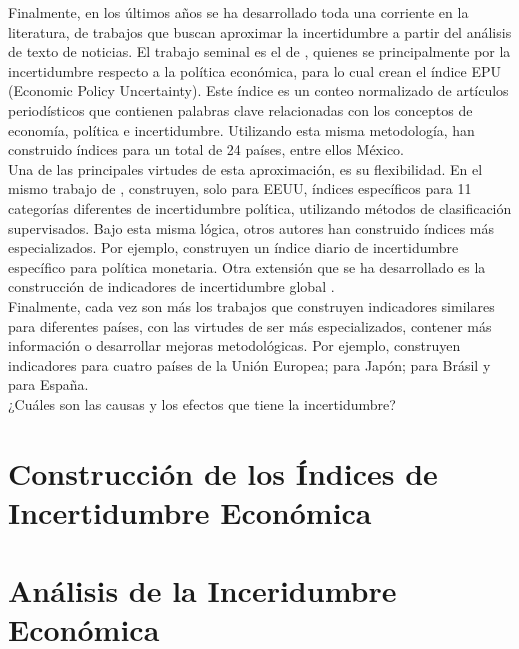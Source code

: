 \documentclass[11pt,a4paper]{article}
\begin{document}
Finalmente, en los últimos años se ha desarrollado toda una corriente en la literatura, de trabajos que buscan aproximar la incertidumbre a partir del análisis de texto de noticias. El trabajo seminal es el de \cite{baker_2016}, quienes se principalmente por la incertidumbre respecto a la política económica, para lo cual crean el índice EPU (Economic Policy Uncertainty). Este índice es un conteo normalizado de artículos periodísticos que contienen palabras clave relacionadas con los conceptos de economía, política e incertidumbre. Utilizando esta misma metodología, han construido índices para un total de 24 países, entre ellos México. \\

Una de las principales virtudes de esta aproximación, es su flexibilidad. En el mismo trabajo de \cite{baker_2016}, construyen, solo para EEUU, índices específicos para 11 categorías diferentes de incertidumbre política, utilizando métodos de clasificación supervisados. Bajo esta misma lógica, otros autores han construido índices más especializados. Por ejemplo, \cite{husted_2016} construyen un índice diario de incertidumbre específico para política monetaria. Otra extensión que se ha desarrollado es la construcción de indicadores de incertidumbre global \citep{davis_2016, caldara_2016, ahir_2018}. \\

Finalmente, cada vez son más los trabajos que construyen indicadores similares para diferentes países, con las virtudes de ser más especializados, contener más información o desarrollar mejoras metodológicas. Por ejemplo, \cite{azqueta_2020} construyen indicadores para cuatro países de la Unión Europea; \cite{arbatli_2017} para Japón; \cite{ferreira_2019} para Brásil y \cite{ghirelli_2019} para España. \\


¿Cuáles son las causas y los efectos que tiene la incertidumbre?

\section{Construcción de los Índices de Incertidumbre Económica}

\section{Análisis de la Inceridumbre Económica}




\end{document}
